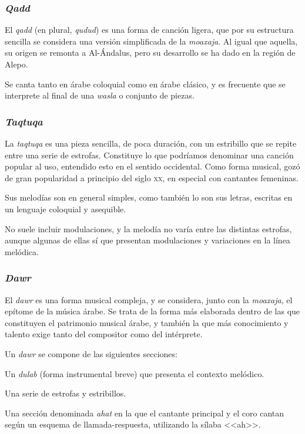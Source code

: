     \subsubsection{\emph{Qadd}}

    El \emph{qadd} (en plural, \emph{qudud}) es una forma de canción ligera, que por su estructura sencilla se considera una versión simplificada de la \emph{moaxaja}. Al igual que aquella, su origen se remonta a Al-Ándalus, pero su desarrollo se ha dado en la región de Alepo.

    Se canta tanto en árabe coloquial como en árabe clásico, y es frecuente que se interprete al final de una \emph{wasla} o conjunto de piezas.


    \subsubsection{\emph{Taqtuqa}}

    La \emph{taqtuqa} es una pieza sencilla, de poca duración, con un estribillo que se repite entre una serie de estrofas. Constituye lo que podríamos denominar una canción popular al uso, entendido esto en el sentido occidental. Como forma musical, gozó de gran popularidad a principio del siglo \textsc{xx}, en especial con cantantes femeninas.

    Sus melodías son en general simples, como también lo son sus letras, escritas en un lenguaje coloquial y asequible.

    No suele incluir modulaciones, y la melodía no varía entre las distintas estrofas, aunque algunas de ellas sí que presentan modulaciones y variaciones en la línea melódica.


    \subsubsection{\emph{Dawr}}

    El \emph{dawr} es una forma musical compleja, y se considera, junto con la \emph{moaxaja}, el epítome de la música árabe. Se trata de la forma más elaborada dentro de las que constituyen el patrimonio musical árabe, y también la que más conocimiento y talento exige tanto del compositor como del intérprete.

    Un \emph{dawr} se compone de las siguientes secciones:

    \begin{compactitem}
      \item Un \emph{dulab} (forma instrumental breve) que presenta el contexto melódico.
      \item Una serie de estrofas y estribillos.
      \item Una sección denominada \emph{ahat} en la que el cantante principal y el coro cantan según un esquema de llamada-respuesta, utilizando la sílaba <<ah>>.
    \end{compactitem}

